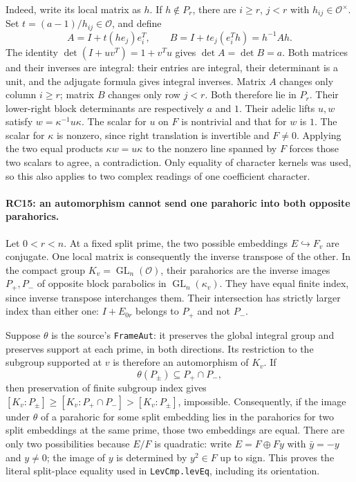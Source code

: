 Indeed, write its local matrix as $h$. If $h\notin P_r$, there are
$i\ge r$, $j<r$ with $h_{ij}\in\mathcal O^\times$.
Set $t=(a-1)/h_{ij}\in\mathcal O$, and define
\[
 A=I+t(he_j)e_i^T,\qquad
 B=I+t e_j(e_i^Th)=h^{-1}Ah.                            \tag{RC.15}
\]
The identity $\det(I+uv^T)=1+v^Tu$ gives
$\det A=\det B=a$. Both matrices and their inverses are integral:
their entries are integral, their determinant is a unit, and the
adjugate formula gives integral inverses.
Matrix $A$ changes only column $i\ge r$; matrix $B$ changes only row
$j<r$. Both therefore lie in $P_r$. Their lower-right block
determinants are respectively $a$ and $1$.
Their adelic lifts $u,w$ satisfy $w=\kappa^{-1}u\kappa$.
The scalar for $u$ on $F$ is nontrivial and that for $w$ is $1$.
The scalar for $\kappa$ is nonzero, since right translation is invertible
and $F\ne0$. Applying the two equal products $\kappa w=u\kappa$
to the nonzero line spanned by $F$ forces those two scalars to agree,
a contradiction. Only equality of character kernels was used, so this
also applies to two complex readings of one coefficient character.

\paragraph{RC15: an automorphism cannot send one parahoric into both opposite parahorics.}
Let $0<r<n$. At a fixed split prime, the two possible embeddings
$E\hookrightarrow F_v$ are conjugate. One local matrix is consequently
the inverse transpose of the other. In the compact group
$K_v=\operatorname{GL}_n(\mathcal O)$, their parahorics are the inverse
images $P_+,P_-$ of opposite block parabolics in
$\operatorname{GL}_n(\kappa_v)$.
They have equal finite index, since inverse transpose interchanges
them. Their intersection has strictly larger index than either one:
$I+E_{0r}$ belongs to $P_+$ and not $P_-$.

Suppose $\theta$ is the source's \texttt{FrameAut}: it preserves the
global integral group and preserves support at each prime, in both
directions. Its restriction to the subgroup supported at $v$ is
therefore an automorphism of $K_v$. If
\[
                  \theta(P_\pm)\subseteq P_+\cap P_-,
                                                               \tag{RC.16}
\]
then preservation of finite subgroup index gives
$[K_v:P_\pm]\ge[K_v:P_+\cap P_-]>[K_v:P_\pm]$, impossible.
Consequently, if the image under $\theta$ of a parahoric for some
split embedding lies in the parahorics for two split embeddings at
the same prime, those two embeddings are equal.
There are only two possibilities because $E/F$ is quadratic:
write $E=F\oplus Fy$ with $\bar y=-y$ and $y\ne0$; the image of $y$
is determined by $y^2\in F$ up to sign. This proves the literal
split-place equality used in \texttt{LevCmp.levEq}, including its
orientation.

